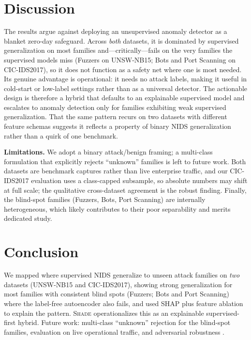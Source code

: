 \documentclass[conference]{IEEEtran}
\begin{document}
\section{Discussion}
The results argue against deploying an unsupervised anomaly detector as a blanket
zero-day safeguard. Across \emph{both} datasets, it is dominated by supervised
generalization on most families and---critically---fails on the very families the
supervised models miss (Fuzzers on UNSW-NB15; Bots and Port Scanning on
CIC-IDS2017), so it does not function as a safety net where one is most needed. Its
genuine advantage is operational: it needs no attack labels, making it useful in
cold-start or low-label settings rather than as a universal detector. The actionable
design is therefore a hybrid that defaults to an explainable supervised model and
escalates to anomaly detection only for families exhibiting weak supervised
generalization. That the same pattern recurs on two datasets with different feature
schemas suggests it reflects a property of binary NIDS generalization rather than a
quirk of one benchmark.

\noindent\textbf{Limitations.} We adopt a binary attack/benign framing; a multi-class
formulation that explicitly rejects ``unknown'' families is left to future work. Both
datasets are benchmark captures rather than live enterprise traffic, and our
CIC-IDS2017 evaluation uses a class-capped subsample, so absolute numbers may shift at
full scale; the qualitative cross-dataset agreement is the robust finding. Finally,
the blind-spot families (Fuzzers, Bots, Port Scanning) are internally heterogeneous,
which likely contributes to their poor separability and merits dedicated study.

\section{Conclusion}
We mapped where supervised NIDS generalize to unseen attack families on
\emph{two} datasets (UNSW-NB15 and CIC-IDS2017), showing strong generalization for
most families with consistent blind spots (Fuzzers; Bots and Port Scanning) where the
label-free autoencoder also fails, and used SHAP plus feature ablation to explain the
pattern. \textsc{Shade} operationalizes this as an explainable supervised-first
hybrid. Future work: multi-class ``unknown'' rejection for the blind-spot families,
evaluation on live operational traffic, and adversarial robustness
\cite{shap_fingerprint}.



\end{document}
